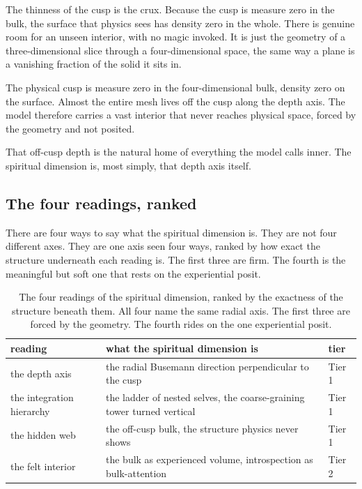 The thinness of the cusp is the crux. Because the cusp is measure zero in the bulk, the surface that physics sees has density zero in the whole. There is genuine room for an unseen interior, with no magic invoked. It is just the geometry of a three-dimensional slice through a four-dimensional space, the same way a plane is a vanishing fraction of the solid it sits in.

\begin{result}
The physical cusp is measure zero in the four-dimensional bulk, density zero on the surface. Almost the entire mesh lives off the cusp along the depth axis. The model therefore carries a vast interior that never reaches physical space, forced by the geometry and not posited.
\end{result}

That off-cusp depth is the natural home of everything the model calls inner. The spiritual dimension is, most simply, that depth axis itself.

\subsection{The four readings, ranked}

There are four ways to say what the spiritual dimension is. They are not four different axes. They are one axis seen four ways, ranked by how exact the structure underneath each reading is. The first three are firm. The fourth is the meaningful but soft one that rests on the experiential posit.

\begin{table}[ht]
\centering
\begin{tabular}{@{}p{2.6cm}p{6.6cm}l@{}}
\toprule
reading & what the spiritual dimension is & tier \\
\midrule
the depth axis & the radial Busemann direction perpendicular to the cusp & Tier 1 \\
the integration hierarchy & the ladder of nested selves, the coarse-graining tower turned vertical & Tier 1 \\
the hidden web & the off-cusp bulk, the structure physics never shows & Tier 1 \\
the felt interior & the bulk as experienced volume, introspection as bulk-attention & Tier 2 \\
\bottomrule
\end{tabular}
\caption{The four readings of the spiritual dimension, ranked by the exactness of the structure beneath them. All four name the same radial axis. The first three are forced by the geometry. The fourth rides on the one experiential posit.}
\label{tab:spiritual-readings}
\end{table}

